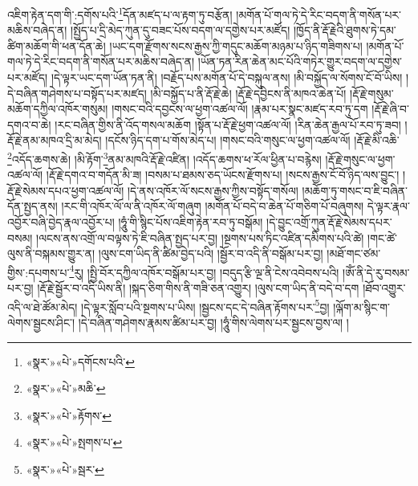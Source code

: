 འཇིག་རྟེན་དག་གི་:དགོས་པའི་\footnote{«སྣར་»«པེ་»དགོངས་པའི་}དོན་མཛད་པ་ལ་རྟག་ཏུ་བརྩོན། །མགོན་པོ་གལ་ཏེ་དེ་རིང་བདག་ནི་གསོན་པར་མཆིས་བཞེད་ན། །སྤྱོད་པ་དྲི་མེད་ཀུན་དུ་བཟང་པོས་བདག་ལ་དགྱེས་པར་མཛོད། །ཁྱོད་ནི་རྡོ་རྗེའི་ཐུགས་ཏེ་དམ་ཚིག་མཆོག་གི་ཕན་དོན་ཆེ། །ཡང་དག་རྫོགས་སངས་རྒྱས་ཀྱི་གདུང་མཆོག་མཉམ་པ་ཉིད་གཟིགས་པ། །མགོན་པོ་གལ་ཏེ་དེ་རིང་བདག་ནི་གསོན་པར་མཆིས་བཞེད་ན། །ཡོན་ཏན་རིན་ཆེན་མང་པོའི་གཏེར་གྱུར་བདག་ལ་དགྱེས་པར་མཛོད། །དེ་ལྟར་ཡང་དག་ཡོན་ཏན་ནི། །བརྗོད་པས་མགོན་པོ་དེ་བསྐུལ་ནས། །མི་བསྐྱོད་ལ་སོགས་ངོ་བོ་ཡིས། །དེ་བཞིན་གཤེགས་པ་བསྟོད་པར་མཛད། །མི་བསྐྱོད་པ་ནི་རྡོ་རྗེ་ཆེ། །རྡོ་རྗེ་དབྱིངས་ནི་མཁའ་ཆེན་པོ། །རྡོ་རྗེ་གསུམ་མཆོག་དཀྱིལ་འཁོར་གསུམ། །གསང་བའི་དབྱངས་ལ་ཕྱག་འཚལ་ལོ། །རྣམ་པར་སྣང་མཛད་རབ་ཏུ་དག །རྡོ་རྗེ་ཞི་བ་དགའ་བ་ཆེ། །རང་བཞིན་གྱིས་ནི་འོད་གསལ་མཆོག །སྟོན་པ་རྡོ་རྗེ་ཕྱག་འཚལ་ལོ། །རིན་ཆེན་རྒྱལ་པོ་རབ་ཏུ་ཟབ། །རྡོ་རྗེ་ནམ་མཁའ་དྲི་མ་མེད། །དངོས་ཉིད་དག་པ་གོས་མེད་པ། །གསང་བའི་གསུང་ལ་ཕྱག་འཚལ་ལོ། །རྡོ་རྗེ་མི་འཆི་\footnote{«སྣར་»«པེ་»མཆི་}འདོད་ཆགས་ཆེ། །མི་རྟོག་\footnote{«སྣར་»«པེ་»རྟོགས་}ནམ་མཁའི་རྡོ་རྗེ་འཛིན། །འདོད་ཆགས་ཕ་རོལ་ཕྱིན་པ་བརྙེས། །རྡོ་རྗེ་གསུང་ལ་ཕྱག་འཚལ་ལོ། །རྡོ་རྗེ་དགའ་བ་གདོན་མི་ཟ། །བསམ་པ་ཐམས་ཅད་ཡོངས་རྫོགས་པ། །སངས་རྒྱས་ངོ་བོ་ཉིད་ལས་བྱུང་། །རྡོ་རྗེ་སེམས་དཔའ་ཕྱག་འཚལ་ལོ། །དེ་ནས་འཁོར་ལོ་སངས་རྒྱས་ཀྱིས་བསྟོད་གསོལ། །མཆོག་ཏུ་གསང་བ་ཇི་བཞིན་དོན་སྤྱད་ནས། །རང་གི་འཁོར་ལོ་ལ་ནི་འཁོར་ལོ་གཞུག །མགོན་པོ་བདེ་བ་ཆེན་པོ་གཅིག་པོ་བཞུགས། དེ་ལྟར་རྣལ་འབྱོར་བཞི་བྱེད་རྣལ་འབྱོར་པ། །ཧཱུཾ་གི་སྙིང་པོས་འཇིག་རྟེན་རབ་ཏུ་བསྒོམ། །དེ་བྱུང་འགྲོ་ཀུན་རྡོ་རྗེ་སེམས་དཔར་བསམ། །ལངས་ནས་འགྲོ་ལ་བལྟས་ཏེ་ཇི་བཞིན་སྤྱད་པར་བྱ། །སྔགས་པས་ཏིང་འཛིན་དམིགས་པའི་ཚེ། །གང་ཚེ་ལུས་ནི་བསྐམས་གྱུར་ན། །ལུས་ངག་ཡིད་ནི་ཚིམ་བྱེད་པའི། །སྦྱོར་བ་འདི་ནི་བསྒོམ་པར་བྱ། །མཐོ་གང་ཙམ་གྱིས་:དཔགས་པ་\footnote{«སྣར་»«པེ་»སྤགས་པ་}རུ། །སྤྱི་བོར་དཀྱིལ་འཁོར་བསྒོམ་པར་བྱ། །བདུད་རྩི་ལྔ་ནི་ངེས་འབེབས་པའི། །ཨོཾ་ནི་དེ་རུ་བསམ་པར་བྱ། །རྡོ་རྗེ་སྦྱོར་བ་འདི་ཡིས་ནི། །སྐད་ཅིག་གིས་ནི་གཟི་ཅན་འགྱུར། །ལུས་ངག་ཡིད་ནི་བདེ་བ་དག །ཐོབ་འགྱུར་འདི་ལ་ཐེ་ཚོམ་མེད། །དེ་ལྟར་སློབ་པའི་སྔགས་པ་ཡིས། །སྦྱངས་དང་དེ་བཞིན་རྟོགས་པར་\footnote{«སྣར་»«པེ་»སྦར་}བྱ། །ལྐོག་མ་སྙིང་ག་ལེགས་སྦྱངས་ཤིང་། །དེ་བཞིན་གཤེགས་རྣམས་ཚིམ་པར་བྱ། །ཧཱུཾ་གིས་ལེགས་པར་སྦྱངས་བྱས་ལ། །
